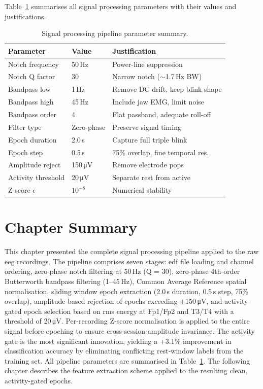 Table~\ref{tab:pipeline_params} summarises all signal
processing parameters with their values and justifications.

\begin{table}[htbp]
\centering
\caption{Signal processing pipeline parameter summary.}
\label{tab:pipeline_params}
\renewcommand{\arraystretch}{1.3}
\begin{tabular}{p{3.0cm} p{2.0cm} p{4.5cm}}
\toprule
\textbf{Parameter} & \textbf{Value} & \textbf{Justification} \\
\midrule
Notch frequency    & 50\,Hz     & Power-line suppression \\
Notch Q factor     & 30         & Narrow notch ($\sim$1.7\,Hz BW) \\
Bandpass low       & 1\,Hz      & Remove DC drift, keep blink shape \\
Bandpass high      & 45\,Hz     & Include jaw EMG, limit noise \\
Bandpass order     & 4          & Flat passband, adequate roll-off \\
Filter type        & Zero-phase & Preserve signal timing \\
Epoch duration     & 2.0\,s     & Capture full triple blink \\
Epoch step         & 0.5\,s     & 75\% overlap, fine temporal res. \\
Amplitude reject   & 150\,\si{\micro\volt} & Remove electrode pops \\
Activity threshold & 20\,\si{\micro\volt} & Separate rest from active \\
Z-score $\epsilon$ & $10^{-8}$  & Numerical stability \\
\bottomrule
\end{tabular}
\end{table}

\section{Chapter Summary}
\label{sec:sp_summary}

This chapter presented the complete signal processing pipeline
applied to the raw \acrshort{eeg} recordings. The pipeline
comprises seven stages: \acrshort{edf} file loading and channel
ordering, zero-phase notch filtering at 50\,Hz (Q = 30), zero-phase
4th-order Butterworth bandpass filtering (1--45\,Hz), Common
Average Reference spatial normalisation, sliding window epoch
extraction (2.0\,s duration, 0.5\,s step, 75\% overlap),
amplitude-based rejection of epochs exceeding
$\pm$150\,\si{\micro\volt}, and activity-gated epoch selection
based on \acrshort{rms} energy at Fp1/Fp2 and T3/T4 with a
threshold of 20\,\si{\micro\volt}. Per-recording Z-score
normalisation is applied to the entire signal before epoching
to ensure cross-session amplitude invariance. The activity gate
is the most significant innovation, yielding a +3.1\% improvement
in classification accuracy by eliminating conflicting
rest-window labels from the training set. All pipeline parameters
are summarised in Table~\ref{tab:pipeline_params}. The following
chapter describes the feature extraction scheme applied to the
resulting clean, activity-gated epochs.